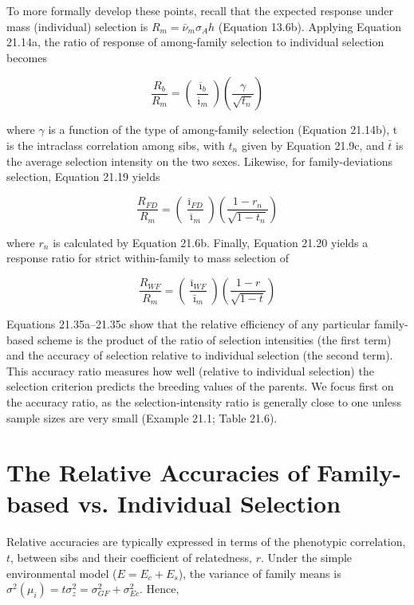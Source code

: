 \documentclass{article}
\begin{document}
To more formally develop these points, recall that the expected response under mass (individual) selection is  $ R_m = \bar{\nu}_m \sigma_A h $ (Equation 13.6b). Applying Equation 21.14a, the ratio of response of among-family selection to individual selection becomes

\begin{equation}
\frac{R_{b}}{R_{m}}=\left(\frac{\overline{\imath}_{b}}{\overline{\imath}_{m}}\right)\left(\frac{\gamma}{\sqrt{t_{n}}}\right)
\tag{21.35a}
\label{eq:21_35a}
\end{equation}

where  $ \gamma $ is a function of the type of among-family selection (Equation 21.14b), t is the intraclass correlation among sibs, with  $ t_n $ given by Equation 21.9c, and  $ \bar{t} $ is the average selection intensity on the two sexes. Likewise, for family-deviations selection, Equation 21.19 yields

\begin{equation}
\frac{R_{FD}}{R_{m}}=\left(\frac{\overline{\imath}_{FD}}{\overline{\imath}_{m}}\right)\left(\frac{1-r_{n}}{\sqrt{1-t_{n}}}\right)
\tag{21.35b}
\label{eq:21_35b}
\end{equation}

where  $ r_{n} $ is calculated by Equation 21.6b. Finally, Equation 21.20 yields a response ratio for strict within-family to mass selection of

\begin{equation}
\frac{R_{WF}}{R_{m}}=\left(\frac{\bar{\imath}_{WF}}{\bar{\imath}_{m}}\right)\left(\frac{1-r}{\sqrt{1-t}}\right)
\tag{21.35c}
\label{eq:21_35c}
\end{equation}

Equations 21.35a–21.35c show that the relative efficiency of any particular family-based scheme is the product of the ratio of selection intensities (the first term) and the accuracy of selection relative to individual selection (the second term). This accuracy ratio measures how well (relative to individual selection) the selection criterion predicts the breeding values of the parents. We focus first on the accuracy ratio, as the selection-intensity ratio is generally close to one unless sample sizes are very small (Example 21.1; Table 21.6).

\section{The Relative Accuracies of Family-based vs. Individual Selection}
Relative accuracies are typically expressed in terms of the phenotypic correlation, $t$, between sibs and their coefficient of relatedness, $r$. Under the simple environmental model ($E = E_c + E_s$), the variance of family means is $\sigma^2(\mu_i) = t\sigma_z^2 = \sigma_{GF}^2 + \sigma_{Ec}^2$. Hence,
\end{document}
